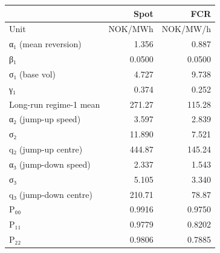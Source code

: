 \begin{tabular}{lrr}
\toprule
 & Spot & FCR \\
\midrule
Unit & NOK/MWh & NOK/MW/h \\
α₁ (mean reversion) & 1.356 & 0.887 \\
β₁ & 0.0500 & 0.0500 \\
σ₁ (base vol) & 4.727 & 9.738 \\
γ₁ & 0.374 & 0.252 \\
Long-run regime-1 mean & 271.27 & 115.28 \\
α₂ (jump-up speed) & 3.597 & 2.839 \\
σ₂ & 11.890 & 7.521 \\
q₂ (jump-up centre) & 444.87 & 145.24 \\
α₃ (jump-down speed) & 2.337 & 1.543 \\
σ₃ & 5.105 & 3.340 \\
q₃ (jump-down centre) & 210.71 & 78.87 \\
P₀₀ & 0.9916 & 0.9750 \\
P₁₁ & 0.9779 & 0.8202 \\
P₂₂ & 0.9806 & 0.7885 \\
\bottomrule
\end{tabular}